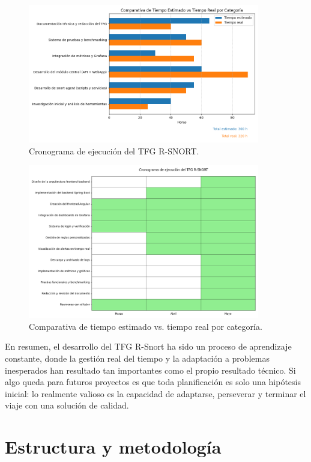 \documentclass[11pt,a4paper,twoside]{report}
\begin{document}
\begin{figure}[H]
	\centering
	\includegraphics[width=0.90\textwidth]{cronologia/1.png}
	\caption{Cronograma de ejecución del TFG R-SNORT.}
\end{figure}

\begin{figure}[H]
	\centering
	\includegraphics[width=0.90\textwidth]{cronologia/2.png}
	\caption{Comparativa de tiempo estimado vs. tiempo real por categoría.}
\end{figure}

En resumen, el desarrollo del TFG R-Snort ha sido un proceso de aprendizaje constante, donde la gestión real del tiempo y la adaptación a problemas inesperados han resultado tan importantes como el propio resultado técnico. Si algo queda para futuros proyectos es que toda planificación es solo una hipótesis inicial: lo realmente valioso es la capacidad de adaptarse, perseverar y terminar el viaje con una solución de calidad.

\section{Estructura y metodología}
\end{document}
